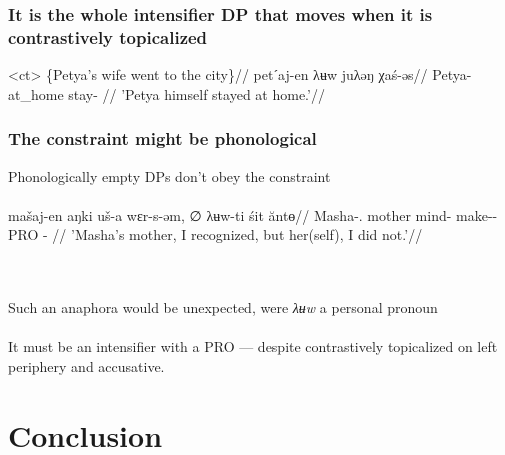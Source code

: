 \documentclass{beamer}
\begin{document}
\begin{frame}
    \frametitle{It is the whole intensifier DP that moves when it is contrastively topicalized}
    
    \ex<ct>
        \begingl
        \glpreamble \{Petya's wife went to the city\}//
            \gla \ljudge{*}petˊaj-en λʉw juλəŋ χaś-əs//
            \glb Petya-\Pssg{} \Int{} at\_home stay-\Pst{} //
            \glft 'Petya himself stayed at home.'//
    \endgl
    \xe
                        
            
\end{frame}

\begin{frame}
    \frametitle{The constraint might be phonological}

    Phonologically empty DPs don't obey the constraint\\~\\

    \begingl
        \gla mašaj-en		aŋki	uš-a		wɛr-s-əm,	∅	λʉw-ti		śit	ăntɵ//
        \glb Masha-\Poss.\Ssg{}	mother mind-\Dat{} make-\Pst-\Fsg{}	PRO \Int{}-\Acc{}	\Dem{}	\Neg{}//
        \glft 'Masha's mother, I recognized, but her(self), I did not.'//
    \endgl

    \pause 
    ~\\~\\ Such an anaphora would be unexpected, were \textit{λʉw} a personal pronoun\\~\\

    It must be an intensifier with a PRO --- despite contrastively topicalized on left periphery and accusative.

\end{frame}

\section{Conclusion}
\end{document}

